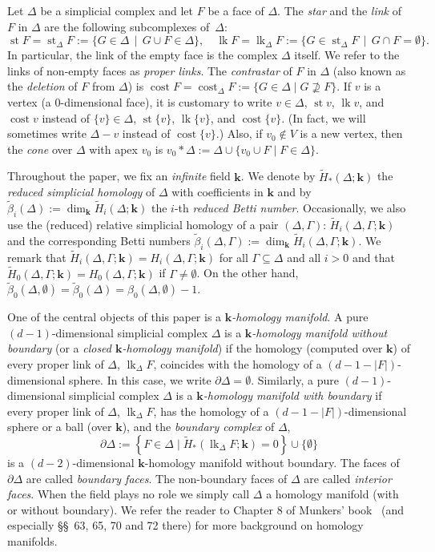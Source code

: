 \documentclass[ALCO,ThmDefs,Unicode,epreuves]{cedram}
\DeclareMathOperator\lk{lk}
\DeclareMathOperator\st{st}
\DeclareMathOperator\cost{cost}
\newcommand{\field}{\mathbf{k}}
\begin{document}
Let $\Delta$ be a simplicial complex and let $F$ be a face of $\Delta$. The \emph{star} and the \emph{link} of $F$ in $\Delta$ are the following subcomplexes of~$\Delta$: 
\[
\st F=\st_\Delta F:=\{G\in \Delta \, \mid \, G\cup F\in \Delta\}, \quad
 \lk F=\lk_\Delta F:=\{G\in \st_\Delta F \, \mid \, G\cap F=\emptyset\}.
\]
In particular, the link of the empty face is the complex $\Delta$ itself. We refer to the links of non-empty faces as \emph{proper links}. The \emph{contrastar} of $F$ in $\Delta$ (also known as the \emph{deletion} of $F$ from $\Delta$) is $\cost F=\cost_\Delta F:=\{G\in \Delta \mid G\not\supseteq F\}$. If $v$ is a vertex (\ie a $0$-dimensional face), it is customary to write $v\in\Delta$, $\st v$, $\lk v$, and $\cost v$ instead of $\{v\}\in\Delta$, $\st \{v\}$, $\lk\{v\}$, and $\cost\{v\}$. (In fact, we will sometimes write $\Delta-v$ instead of $\cost\{v\}$.)
Also, if $v_0\notin V$ is a new vertex, then the \emph{cone} over $\Delta$ with apex $v_0$ is $v_0\ast\Delta:=\Delta \cup \{v_0\cup F \mid F\in \Delta\}$.


Throughout the paper, we fix an \emph{infinite} field $\field$. We denote by $\tilde{H}_\ast(\Delta;\field)$ the \emph{reduced simplicial homology} of $\Delta$ with coefficients in $\field$ and by $\tilde{\beta}_i(\Delta):=\dim_\field \tilde{H}_i(\Delta;\field)$ the $i$-th \emph{reduced Betti number}. Occasionally, we also use the (reduced) relative simplicial homology of a pair $(\Delta,\Gamma)$: $\tilde{H}_i(\Delta, \Gamma;\field)$ and the corresponding Betti numbers $\tilde{\beta}_i(\Delta, \Gamma):=\dim_\field \tilde{H}_i(\Delta, \Gamma;\field)$. We remark that $\tilde{H}_i(\Delta, \Gamma;\field)=H_i(\Delta, \Gamma;\field)$ for all $\Gamma\subseteq \Delta$ and all $i>0$ and that $\tilde{H}_0(\Delta, \Gamma;\field)=H_0(\Delta, \Gamma;\field)$ if $\Gamma\neq \emptyset$. On the other hand, $\tilde{\beta}_0(\Delta,\emptyset)=\tilde{\beta}_0(\Delta)=\beta_0(\Delta,\emptyset)-1$.

One of the central objects of this paper is a \emph{$\field$-homology manifold}. A pure $(d-1)$-dimensional simplicial complex $\Delta$ is a \emph{$\field$-homology manifold without boundary} (or a \emph{closed $\field$-homology manifold}) if the homology (computed over $\field$) of every proper link of $\Delta$, $\lk_\Delta F$, coincides with the homology of a $(d-1-|F|)$-dimensional sphere. In this case, we write $\partial \Delta = \emptyset$. Similarly, a pure $(d-1)$-dimensional simplicial complex $\Delta$ is a \emph{$\field$-homology manifold with boundary} if every proper link of $\Delta$, $\lk_\Delta F$, has the homology of a $(d-1-|F|)$-dimensional sphere or a ball (over $\field$), and the \emph{boundary complex} of $\Delta$, \ie  
\[ 
\partial \Delta:= \left\{F \in \Delta \mid \tilde{H}_\ast(\lk_\Delta F; \field)=0\right\}\cup\{\emptyset\}
\]
is a $(d-2)$-dimensional $\field$-homology manifold without boundary. The faces of $\partial\Delta$ are called \emph{boundary faces}. The non-boundary faces of $\Delta$ are called \emph{interior faces}. When the field plays no role we simply call $\Delta$ a homology manifold (with or without boundary). We refer the reader to Chapter 8 of Munkers' book~\cite{Munkres-book} (and especially \S\S~63, 65, 70 and 72 there) for more background on homology manifolds.
\end{document}
